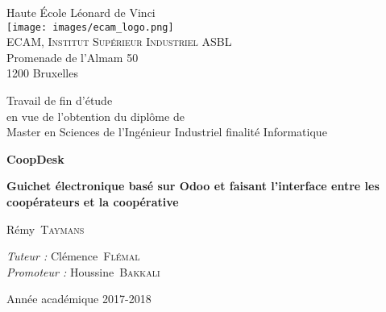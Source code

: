 \documentclass[
    a4paper,
    11pt,
    $for(classoption)$$classoption$,$endfor$
    onecolumn,
    titlepage,
    openany,
]{$if(documentclass)$$documentclass$$else$report$endif$}
\begin{document}

    \begin{titlepage}
        \sffamily

        \begin{center}
            Haute École Léonard de Vinci \\
            \centering
            \texttt{[image: images/ecam\_logo.png]} \\
            \textsc{ECAM, Institut Supérieur Industriel ASBL} \\
            {\small
                Promenade de l'Almam 50 \\
                1200 Bruxelles
            }

            \vspace{2cm}
            {\large
                Travail de fin d'étude \\
                en vue de l'obtention du diplôme de \\
                Master en Sciences de l'Ingénieur Industriel finalité
                Informatique
            }

            \vspace{1cm}
            {\huge\bfseries
                CoopDesk \par
            }
            {\LARGE\bfseries
                Guichet électronique basé sur Odoo et faisant
                l'interface entre les coopérateurs et la coopérative
            }

            \vspace{1cm}
            {\Large
                Rémy~\textsc{Taymans}
            }

            \vspace{2cm}
            {\large
                \textit{Tuteur :} Clémence~\textsc{Flémal} \\
                \textit{Promoteur :} Houssine~\textsc{Bakkali}
            }

            \vfill
            {\large
                Année académique 2017-2018
            }
        \end{center}

        \normalfont

    \end{titlepage}

    \thispagestyle{empty}
    \cleardoublepage
\end{document}
